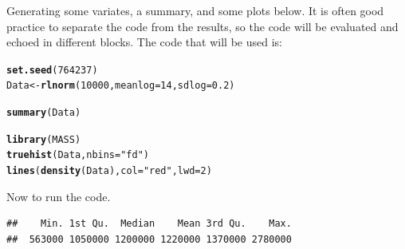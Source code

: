 \documentclass[letterpaper]{article}\usepackage[]{graphicx}\usepackage[]{color}
\makeatletter
\newcommand{\hlnum}[1]{\textcolor[rgb]{0.686,0.059,0.569}{#1}}%
\newcommand{\hlstr}[1]{\textcolor[rgb]{0.192,0.494,0.8}{#1}}%
\newcommand{\hlstd}[1]{\textcolor[rgb]{0.345,0.345,0.345}{#1}}%
\newcommand{\hlkwb}[1]{\textcolor[rgb]{0.69,0.353,0.396}{#1}}%
\newcommand{\hlkwc}[1]{\textcolor[rgb]{0.333,0.667,0.333}{#1}}%
\newcommand{\hlkwd}[1]{\textcolor[rgb]{0.737,0.353,0.396}{\textbf{#1}}}%
\newenvironment{kframe}{%
 \def\at@end@of@kframe{}%
 \ifinner\ifhmode%
  \def\at@end@of@kframe{\end{minipage}}%
  \begin{minipage}{\columnwidth}%
 \fi\fi%
 \def\FrameCommand##1{\hskip\@totalleftmargin \hskip-\fboxsep
 \colorbox{shadecolor}{##1}\hskip-\fboxsep
     \hskip-\linewidth \hskip-\@totalleftmargin \hskip\columnwidth}%
 \MakeFramed {\advance\hsize-\width
   \@totalleftmargin\z@ \linewidth\hsize
   \@setminipage}}%
 {\par\unskip\endMakeFramed%
 \at@end@of@kframe}
\newenvironment{knitrout}{}{} %
\makeatother
\begin{document}
Generating some variates, a summary, and some plots below. It is often good practice to separate the code from the results, so the code will be evaluated and echoed in different blocks. The code that will be used is:
\begin{knitrout}
\color{fgcolor}\begin{kframe}
\begin{alltt}
\hlkwd{set.seed}\hlstd{(}\hlnum{764237}\hlstd{)}
\hlstd{Data} \hlkwb{<-} \hlkwd{rlnorm}\hlstd{(}\hlnum{10000}\hlstd{,} \hlkwc{meanlog} \hlstd{=} \hlnum{14}\hlstd{,} \hlkwc{sdlog} \hlstd{=} \hlnum{0.2}\hlstd{)}
\end{alltt}
\end{kframe}
\end{knitrout}

\begin{knitrout}
\color{fgcolor}\begin{kframe}
\begin{alltt}
\hlkwd{summary}\hlstd{(Data)}
\end{alltt}
\end{kframe}
\end{knitrout}

\begin{knitrout}
\color{fgcolor}\begin{kframe}
\begin{alltt}
\hlkwd{library}\hlstd{(MASS)}
\hlkwd{truehist}\hlstd{(Data,} \hlkwc{nbins} \hlstd{=} \hlstr{"fd"}\hlstd{)}
\hlkwd{lines}\hlstd{(}\hlkwd{density}\hlstd{(Data),} \hlkwc{col} \hlstd{=} \hlstr{"red"}\hlstd{,} \hlkwc{lwd} \hlstd{=} \hlnum{2}\hlstd{)}
\end{alltt}
\end{kframe}
\end{knitrout}

Now to run the code.


\begin{knitrout}
\color{fgcolor}\begin{kframe}
\begin{verbatim}
##    Min. 1st Qu.  Median    Mean 3rd Qu.    Max. 
##  563000 1050000 1200000 1220000 1370000 2780000
\end{verbatim}
\end{kframe}
\end{knitrout}
\end{document}

